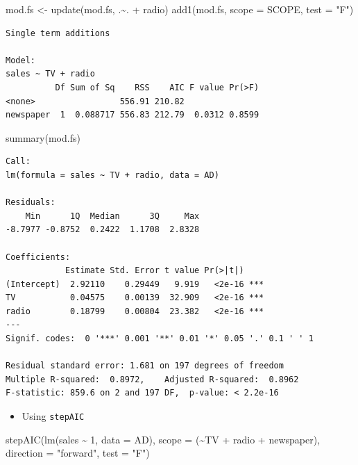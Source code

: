 \documentclass[
]{article}
\newenvironment{Shaded}{\begin{snugshade}}{\end{snugshade}}
\newcommand{\AttributeTok}[1]{\textcolor[rgb]{0.77,0.63,0.00}{#1}}
\newcommand{\DecValTok}[1]{\textcolor[rgb]{0.00,0.00,0.81}{#1}}
\newcommand{\FunctionTok}[1]{\textcolor[rgb]{0.00,0.00,0.00}{#1}}
\newcommand{\NormalTok}[1]{#1}
\newcommand{\OtherTok}[1]{\textcolor[rgb]{0.56,0.35,0.01}{#1}}
\newcommand{\SpecialCharTok}[1]{\textcolor[rgb]{0.00,0.00,0.00}{#1}}
\newcommand{\StringTok}[1]{\textcolor[rgb]{0.31,0.60,0.02}{#1}}
\providecommand{\tightlist}{%
  \setlength{\itemsep}{0pt}\setlength{\parskip}{0pt}}
\begin{document}
\begin{Shaded}
\begin{Highlighting}[]
\NormalTok{mod.fs }\OtherTok{\textless{}{-}} \FunctionTok{update}\NormalTok{(mod.fs, .}\SpecialCharTok{\textasciitilde{}}\NormalTok{. }\SpecialCharTok{+}\NormalTok{ radio)}
\FunctionTok{add1}\NormalTok{(mod.fs, }\AttributeTok{scope =}\NormalTok{ SCOPE, }\AttributeTok{test =} \StringTok{"F"}\NormalTok{)}
\end{Highlighting}
\end{Shaded}

\begin{verbatim}
Single term additions

Model:
sales ~ TV + radio
          Df Sum of Sq    RSS    AIC F value Pr(>F)
<none>                 556.91 210.82               
newspaper  1  0.088717 556.83 212.79  0.0312 0.8599
\end{verbatim}

\begin{Shaded}
\begin{Highlighting}[]
\FunctionTok{summary}\NormalTok{(mod.fs)}
\end{Highlighting}
\end{Shaded}

\begin{verbatim}
Call:
lm(formula = sales ~ TV + radio, data = AD)

Residuals:
    Min      1Q  Median      3Q     Max 
-8.7977 -0.8752  0.2422  1.1708  2.8328 

Coefficients:
            Estimate Std. Error t value Pr(>|t|)    
(Intercept)  2.92110    0.29449   9.919   <2e-16 ***
TV           0.04575    0.00139  32.909   <2e-16 ***
radio        0.18799    0.00804  23.382   <2e-16 ***
---
Signif. codes:  0 '***' 0.001 '**' 0.01 '*' 0.05 '.' 0.1 ' ' 1

Residual standard error: 1.681 on 197 degrees of freedom
Multiple R-squared:  0.8972,    Adjusted R-squared:  0.8962 
F-statistic: 859.6 on 2 and 197 DF,  p-value: < 2.2e-16
\end{verbatim}

\begin{itemize}
\tightlist
\item
  Using \texttt{stepAIC}
\end{itemize}

\begin{Shaded}
\begin{Highlighting}[]
\FunctionTok{stepAIC}\NormalTok{(}\FunctionTok{lm}\NormalTok{(sales }\SpecialCharTok{\textasciitilde{}} \DecValTok{1}\NormalTok{, }\AttributeTok{data =}\NormalTok{ AD), }\AttributeTok{scope =}\NormalTok{ (}\SpecialCharTok{\textasciitilde{}}\NormalTok{TV }\SpecialCharTok{+}\NormalTok{ radio }\SpecialCharTok{+}\NormalTok{ newspaper), }\AttributeTok{direction =} \StringTok{"forward"}\NormalTok{, }\AttributeTok{test =} \StringTok{"F"}\NormalTok{)}
\end{Highlighting}
\end{Shaded}
\end{document}
